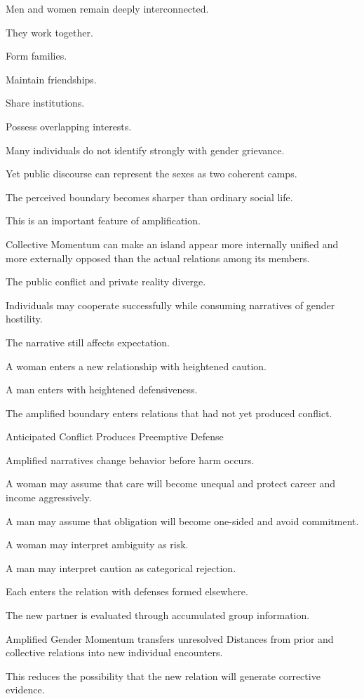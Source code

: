 Men and women remain deeply interconnected.

They work together.

Form families.

Maintain friendships.

Share institutions.

Possess overlapping interests.

Many individuals do not identify strongly with gender grievance.

Yet public discourse can represent the sexes as two coherent camps.

The perceived boundary becomes sharper than ordinary social life.

This is an important feature of amplification.

Collective Momentum can make an island appear more internally unified and more externally opposed than the actual relations among its members.

The public conflict and private reality diverge.

Individuals may cooperate successfully while consuming narratives of gender hostility.

The narrative still affects expectation.

A woman enters a new relationship with heightened caution.

A man enters with heightened defensiveness.

The amplified boundary enters relations that had not yet produced conflict.

Anticipated Conflict Produces Preemptive Defense

Amplified narratives change behavior before harm occurs.

A woman may assume that care will become unequal and protect career and income aggressively.

A man may assume that obligation will become one-sided and avoid commitment.

A woman may interpret ambiguity as risk.

A man may interpret caution as categorical rejection.

Each enters the relation with defenses formed elsewhere.

The new partner is evaluated through accumulated group information.

Amplified Gender Momentum transfers unresolved Distances from prior and collective relations into new individual encounters.

This reduces the possibility that the new relation will generate corrective evidence.

